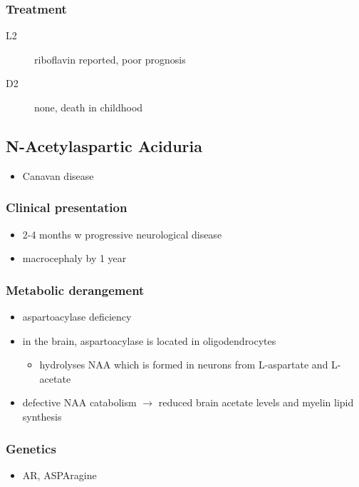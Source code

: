 \documentclass{scrartcl}
\begin{document}
\subsubsection{Treatment}
\label{sec:org6494656}
\begin{description}
\item[{L2}] riboflavin reported, poor prognosis
\item[{D2}] none, death in childhood
\end{description}

\subsection{N-Acetylaspartic Aciduria}
\label{sec:orgfba3970}
\begin{itemize}
\item Canavan disease
\end{itemize}
\subsubsection{Clinical presentation}
\label{sec:orgc7083b1}
\begin{itemize}
\item 2-4 months w progressive neurological disease
\item macrocephaly by 1 year
\end{itemize}

\subsubsection{Metabolic derangement}
\label{sec:org30d2c24}
\begin{itemize}
\item aspartoacylase deficiency
\end{itemize}
\begin{itemize}
\item in the brain, aspartoacylase is located in oligodendrocytes
\begin{itemize}
\item hydrolyses NAA which is formed in neurons from L-aspartate and
L-acetate
\end{itemize}
\item defective NAA catabolism \(\to\) reduced brain acetate levels and myelin
lipid synthesis
\end{itemize}

\subsubsection{Genetics}
\label{sec:org059b661}
\begin{itemize}
\item AR, ASPAragine
\end{itemize}
\end{document}
